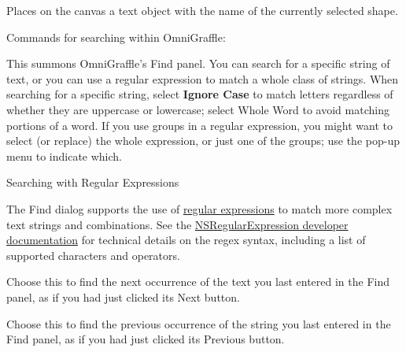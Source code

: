 \documentclass[../main.tex]{subfiles}
\begin{document}
\begin{description}[style=nextline]
\begin{description}[style=nextline]
      \item[{GraphicName \texttt{<\%GraphicName\%>}}] Places on the canvas a text object with the
        name of the currently selected shape.
    \end{description}
  \item[{Find}] Commands for searching within OmniGraffle:

    \begin{description}[style=nextline]
      \item[{Find (\textbf{Command-F})}] This summons OmniGraffle's Find panel. You can search for
        a specific string of text, or you can use a regular expression to match a whole class of
        strings. When searching for a specific string, select \textbf{Ignore Case} to match
        letters regardless of whether they are uppercase or lowercase; select Whole Word to avoid
        matching portions of a word. If you use groups in a regular expression, you might want to
        select (or replace) the whole expression, or just one of the groups; use the pop-up menu
        to indicate which.
    \end{description}

    \begin{ogsidebar}
      Searching with Regular Expressions

      The Find dialog supports the use of
      \href{https://en.wikipedia.org/wiki/Regular_expression}{regular expressions} to match more
      complex text strings and combinations. See the
      \href{https://developer.apple.com/documentation/foundation/nsregularexpression}{NSRegularExpression
      developer documentation} for technical details on the regex syntax, including a list of
      supported characters and operators.
    \end{ogsidebar}

    \begin{description}[style=nextline]
      \item[{Find Next (\textbf{Command-G})}] Choose this to find the next occurrence of the text
        you last entered in the Find panel, as if you had just clicked its Next button.
      \item[{Find Previous (\textbf{Shift-Command-D})}] Choose this to find the previous
        occurrence of the string you last entered in the Find panel, as if you had just clicked
        its Previous button.
    \end{description}


\end{description}
\end{document}
